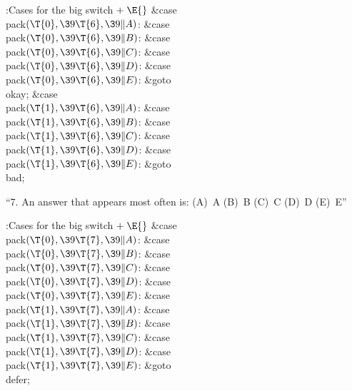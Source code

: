 \Y\B\4:Cases for the big switch\X${}\mathrel+\E{}$\6
\4\&{case} \\{pack}${}(\T{0},\39\T{6},\39\|A){}$:\5
\&{case} \\{pack}${}(\T{0},\39\T{6},\39\|B){}$:\5
\&{case} \\{pack}${}(\T{0},\39\T{6},\39\|C){}$:\5
\&{case} \\{pack}${}(\T{0},\39\T{6},\39\|D){}$:\5
\&{case} \\{pack}${}(\T{0},\39\T{6},\39\|E){}$:\5
\&{goto} \\{okay};\6
\4\&{case} \\{pack}${}(\T{1},\39\T{6},\39\|A){}$:\5
\&{case} \\{pack}${}(\T{1},\39\T{6},\39\|B){}$:\5
\&{case} \\{pack}${}(\T{1},\39\T{6},\39\|C){}$:\5
\&{case} \\{pack}${}(\T{1},\39\T{6},\39\|D){}$:\5
\&{case} \\{pack}${}(\T{1},\39\T{6},\39\|E){}$:\5
\&{goto} \\{bad};\par
\fi

``7. An answer that appears most often is:
(A)~A (B)~B (C)~C (D)~D (E)~E''

\Y\B\4:Cases for the big switch\X${}\mathrel+\E{}$\6
\4\&{case} \\{pack}${}(\T{0},\39\T{7},\39\|A){}$:\5
\&{case} \\{pack}${}(\T{0},\39\T{7},\39\|B){}$:\5
\&{case} \\{pack}${}(\T{0},\39\T{7},\39\|C){}$:\5
\&{case} \\{pack}${}(\T{0},\39\T{7},\39\|D){}$:\5
\&{case} \\{pack}${}(\T{0},\39\T{7},\39\|E){}$:\5
\&{case} \\{pack}${}(\T{1},\39\T{7},\39\|A){}$:\5
\&{case} \\{pack}${}(\T{1},\39\T{7},\39\|B){}$:\5
\&{case} \\{pack}${}(\T{1},\39\T{7},\39\|C){}$:\5
\&{case} \\{pack}${}(\T{1},\39\T{7},\39\|D){}$:\5
\&{case} \\{pack}${}(\T{1},\39\T{7},\39\|E){}$:\5
\&{goto} \\{defer};\par
\fi

